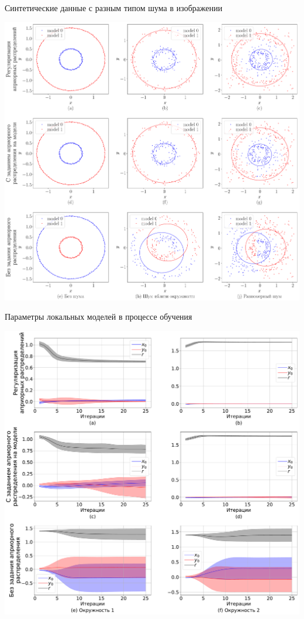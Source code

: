 \documentclass[9pt,pdf,hyperref={unicode}]{beamer}
\begin{document}
\begin{frame}{Синтетические данные с разным типом шума в изображении}
\justifying
\begin{center}
	\includegraphics[height=0.9\textheight]{result/experiment_synthetic}
\end{center}

\end{frame}
\begin{frame}{Параметры локальных моделей в процессе обучения}
\justifying
\begin{center}
	\includegraphics[height=0.9\textheight]{result/experiment_synthetic_param_progress}
\end{center}

\end{frame}
\end{document}
